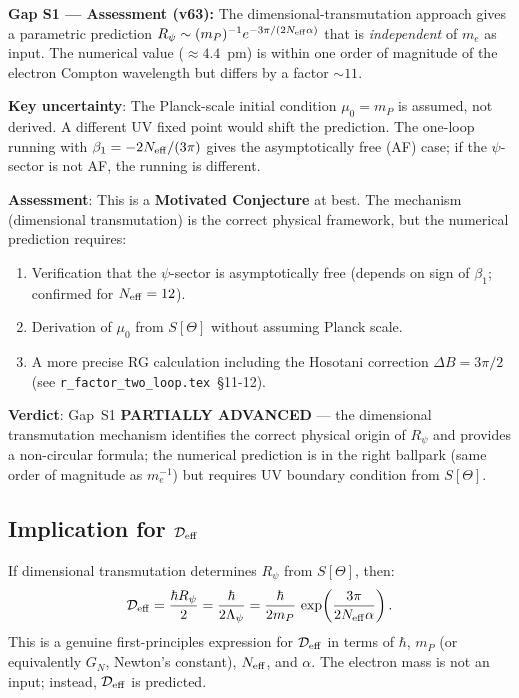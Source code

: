\documentclass[12pt]{article}
\theoremstyle{definition}
\theoremstyle{remark}
\begin{document}
\begin{gapbox}
\textbf{Gap S1 — Assessment (v63):}
The dimensional-transmutation approach gives a parametric prediction
$R_\psi \sim (m_P)^{-1} e^{-3\pi/(2N_{\rm eff}\alpha)}$ that is
\emph{independent} of $m_e$ as input.  The numerical value ($\approx 4.4$~pm)
is within one order of magnitude of the electron Compton wavelength
but differs by a factor $\sim 11$.

\medskip
\textbf{Key uncertainty}: The Planck-scale initial condition $\mu_0 = m_P$
is assumed, not derived.  A different UV fixed point would shift the prediction.
The one-loop running with $\beta_1 = -2N_{\rm eff}/(3\pi)$ gives the asymptotically
free (AF) case; if the $\psi$-sector is not AF, the running is different.

\medskip
\textbf{Assessment}: This is a \textbf{Motivated Conjecture} at best.
The mechanism (dimensional transmutation) is the correct physical framework,
but the numerical prediction requires:
\begin{enumerate}
  \item Verification that the $\psi$-sector is asymptotically free
        (depends on sign of $\beta_1$; confirmed for $N_{\rm eff} = 12$).
  \item Derivation of $\mu_0$ from $S[\Theta]$ without assuming Planck scale.
  \item A more precise RG calculation including the Hosotani correction
        $\Delta B = 3\pi/2$ (see \texttt{r\_factor\_two\_loop.tex}~§11-12).
\end{enumerate}

\medskip
\textbf{Verdict}: Gap~S1 \textbf{PARTIALLY ADVANCED} — the dimensional
transmutation mechanism identifies the correct physical origin of $R_\psi$
and provides a non-circular formula; the numerical prediction is in the right
ballpark (same order of magnitude as $m_e^{-1}$) but requires UV boundary
condition from $S[\Theta]$.
\end{gapbox}

\subsection{Implication for $\mathcal{D}_{\rm eff}$}

If dimensional transmutation determines $R_\psi$ from $S[\Theta]$, then:
\begin{equation}
  \mathcal{D}_{\rm eff} = \frac{\hbar R_\psi}{2}
  = \frac{\hbar}{2\Lambda_\psi}
  = \frac{\hbar}{2m_P}\,\exp\!\left(\frac{3\pi}{2N_{\rm eff}\alpha}\right).
  \label{eq:Deff_from_Lambda}
\end{equation}
This is a genuine first-principles expression for $\mathcal{D}_{\rm eff}$ in terms
of $\hbar$, $m_P$ (or equivalently $G_N$, Newton's constant), $N_{\rm eff}$, and
$\alpha$.  The electron mass is not an input; instead, $\mathcal{D}_{\rm eff}$
is predicted.
\end{document}
